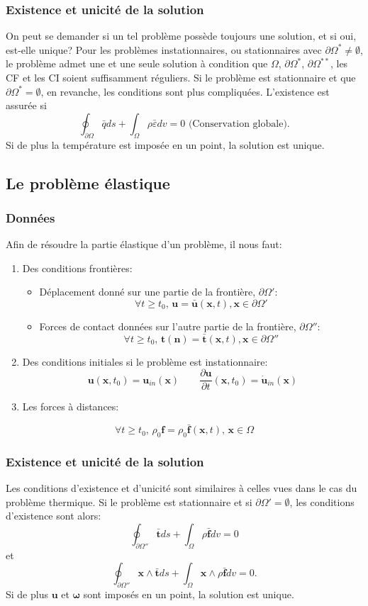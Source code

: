 \subsubsection*{Existence et unicité de la solution}
On peut se demander si un tel problème possède toujours une solution, et si oui, est-elle unique? Pour les problèmes instationnaires, ou stationnaires avec $\partial\Omega^*\neq \emptyset$, le problème admet une et une seule solution à condition que $\Omega$, $\partial\Omega^*$, $\partial\Omega^{**}$, les CF et les CI soient suffisamment réguliers. Si le problème est stationnaire et que $\partial\Omega^*=\emptyset$, en revanche, les conditions sont plus compliquées. L'existence est assurée si
$$\oint_{\partial\Omega}\bar{q}ds+\int_{\Omega}\rho\bar{\varepsilon}dv=0\text{  (Conservation globale)}.$$
Si de plus la température est imposée en un point, la solution est unique.

\subsection{Le problème élastique}
\subsubsection*{Données}
Afin de résoudre la partie élastique d'un problème, il nous faut:
\begin{enumerate}
\item Des conditions frontières:
	\begin{itemize}
	\item Déplacement donné sur une partie de la frontière, $\partial\Omega'$:
	 $$\forall t\geq t_0,\, \textbf{u}=\bar{\textbf{u}}(\textbf{x},t), \textbf{x}\in\partial\Omega'$$
	\item Forces de contact données sur l'autre partie de la frontière, $\partial\Omega''$:
	 $$\forall t\geq t_0,\, \textbf{t}(\textbf{n})=\bar{\textbf{t}}(\textbf{x},t), \textbf{x}\in\partial\Omega''$$
	\end{itemize} 
\item Des conditions initiales si le problème est instationnaire: $$\textbf{u}(\textbf{x},t_0)=\textbf{u}_{in}(\textbf{x})\qquad \frac{\partial\textbf{u}}{\partial t}(\textbf{x},t_0)=\dot{\textbf{u}}_{in}(\textbf{x})$$
\item Les forces à distances: 
\end{enumerate}
$$\forall t \geq t_0,\, \rho_0\textbf{f}=\rho_0\bar{\textbf{f}}(\textbf{x},t),\,\textbf{x}\in\Omega$$
\subsubsection*{Existence et unicité de la solution}
Les conditions d'existence et d'unicité sont similaires à celles vues dans le cas du problème thermique. Si le problème est stationnaire et si $\partial\Omega'=\emptyset$, les conditions d'existence sont alors:
$$\oint_{\partial\Omega''}\bar{\textbf{t}}ds+\int_{\Omega}\rho\bar{\textbf{f}}dv=0$$
et
$$\oint_{\partial\Omega''}\textbf{x}\wedge\bar{\textbf{t}}ds+\int_{\Omega}\textbf{x}\wedge\rho\bar{\textbf{f}}dv=0.$$Si de plus $\textbf{u}$ et $\boldsymbol{\omega}$ sont imposés en un point, la solution est unique.
